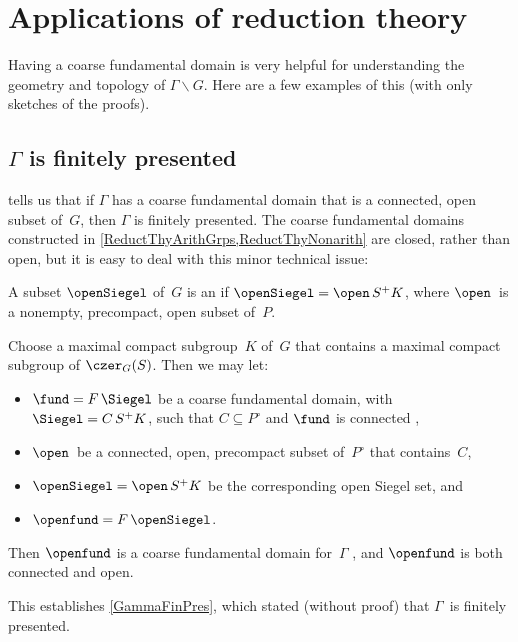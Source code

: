 \section{Applications of reduction theory} \label{ReductionAppsSect}

Having a coarse fundamental domain is very helpful for understanding the geometry and topology of $\Gamma \backslash G$. Here are a few examples of this (with only sketches of the proofs).





\subsection{$\Gamma$ is finitely presented} \label{FinPresSect}
 tells us that if $\Gamma$ has a coarse fundamental domain that is a connected, open subset of~$G$, then $\Gamma$ is finitely presented. The coarse fundamental domains constructed in \cref{ReductThyArithGrps,ReductThyNonarith} are closed, rather than open, but it is easy to deal with this minor technical issue: 

\begin{defn}
A subset $\openSiegel$ of~$G$ is an  if
$\openSiegel = \open \, S^+ K$, where $\open$\, is a nonempty, precompact, open subset of~$P$.
\end{defn}

Choose a maximal compact subgroup~$K$ of~$G$ that contains a maximal compact subgroup of $\czer_G(S)$. Then we may let:
	\begin{itemize}
	\item $\fund = F \, \Siegel$ be a coarse fundamental domain, with $\Siegel = C \, S^+ K$, such that $C \subseteq P^\circ$ and $\fund$ is connected , 
	\item $\open$\, be a connected, open, precompact subset of~$P^\circ$ that contains~$C$,
	\item $\openSiegel = \open \,S^+ K$ be the corresponding open Siegel set,
	and
	\item $\openfund = F \, \openSiegel$.
	\end{itemize}
Then $\openfund$ is a coarse fundamental domain for~$\Gamma$ , and $\openfund$ is both connected and open.

This establishes \cref{GammaFinPres}, which stated (without proof) that $\Gamma$~is finitely presented.



